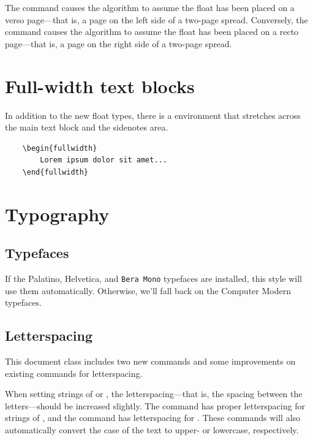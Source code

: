 The  command causes the algorithm to assume the
float has been placed on a verso page---that is, a page on the left side of a
two-page spread.  Conversely, the  command causes
the algorithm to assume the float has been placed on a recto page---that is, a
page on the right side of a two-page spread.


\section{Full-width text blocks}

In addition to the new float types, there is a 
environment that stretches across the main text block and the sidenotes
area.

\begin{Verbatim}
	\begin{fullwidth}
		Lorem ipsum dolor sit amet...
	\end{fullwidth}
\end{Verbatim}

\begin{fullwidth}
	\small\itshape\lipsum[1]
\end{fullwidth}

\section{Typography}\label{sec:typography}

\subsection{Typefaces}\label{sec:typefaces}
If the Palatino, \textsf{Helvetica}, and \texttt{Bera Mono} typefaces are installed, this style
will use them automatically.  Otherwise, we'll fall back on the Computer Modern
typefaces.

\subsection{Letterspacing}\label{sec:letterspacing}
This document class includes two new commands and some improvements on
existing commands for letterspacing.

When setting strings of  or , the
letter\-spacing---that is, the spacing between the letters---should be
increased slightly.\cite{Bringhurst2005}  The  command has proper letterspacing for
strings of , and the  command
has letterspacing for .  These commands
will also automatically convert the case of the text to upper- or
lowercase, respectively.

